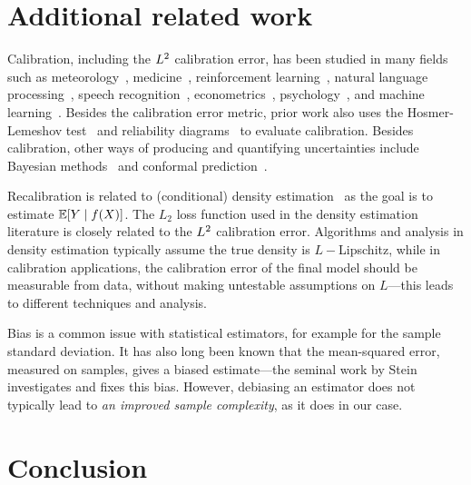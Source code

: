 \section{Additional related work}

Calibration, including the $L^2$ calibration error, has been studied in many fields such as meteorology~\cite{murphy1973vector, murphy1977reliability, degroot1983forecasters,gneiting2005weather, brocker2009decomposition}, medicine~\cite{jiang2012calibrating, crowson2017calibration, harrell1996prognostic}, reinforcement learning~\cite{malik2019calibrated}, natural language processing~\cite{nguyen2015posterior, card2018calibration}, speech recognition~\cite{dong2011calibration}, econometrics~\cite{gneiting2007probabilistic}, psychology~\cite{lichtenstein1982calibration}, and machine learning~\cite{guo2017calibration, zadrozny2001calibrated, kuleshov2018accurate, zadrozny2002transforming, naeini2014binary, hendrycks2019anomaly, hendrycks2019pretraining}. Besides the calibration error metric, prior work also uses the Hosmer-Lemeshov test~\cite{hosmer1980goodness} and reliability diagrams~\cite{degroot1983forecasters, brocker2007reliability} to evaluate calibration. Besides calibration, other ways of producing and quantifying uncertainties include Bayesian methods~\cite{gelman1995bayesian} and conformal prediction~\cite{shafer2008tutorial, lei2016distribution}.

Recalibration is related to (conditional) density estimation~\cite{wasserman2019, parzen1962} as the goal is to estimate $\mathbb{E}[Y \mid f(X)]$. The $L_2$ loss function used in the density estimation literature is closely related to the $L^2$ calibration error. Algorithms and analysis in density estimation typically assume the true density is $L-$Lipschitz, while in calibration applications, the calibration error of the final model should be measurable from data, without making untestable assumptions on $L$---this leads to different techniques and analysis.


Bias is a common issue with statistical estimators, for example for the sample standard deviation. It has also long been known that the mean-squared error, measured on samples, gives a biased estimate---the seminal work by Stein~\cite{stein81sure} investigates and fixes this bias. However, debiasing an estimator does not typically lead to \emph{an improved sample complexity}, as it does in our case.

\section{Conclusion}

